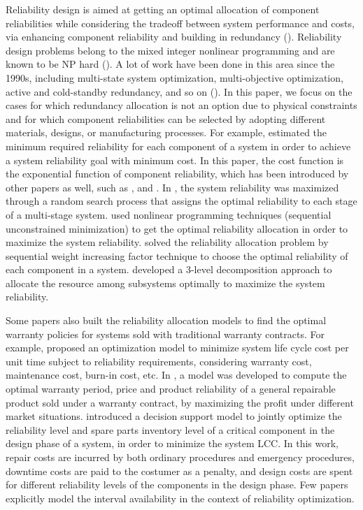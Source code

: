 \documentclass[preprint,12pt]{elsarticle}
\begin{document}
 Reliability design is aimed at getting an optimal allocation of component reliabilities while considering the tradeoff between system performance and costs, via enhancing component reliability and building in redundancy (\citet{Kuo}). Reliability design problems belong to the mixed integer nonlinear programming and are known to be NP hard (\citet{Chern}). A lot of work have been done in this area since the 1990s, including multi-state system optimization, multi-objective optimization, active and cold-standby redundancy, and so on (\citet{Kuo}). In this paper, we focus on the cases for which redundancy allocation is not an option due to physical constraints and for which component reliabilities can be selected by adopting different materials, designs, or manufacturing processes. For example, \citet{Mettas} estimated the minimum required reliability for each component of a system in order to achieve a system reliability goal with minimum cost. In this paper, the cost function is the exponential function of component reliability, which has been introduced by other papers as well, such as \citet{Huang}, \citet{Oner2010} and \citet{Jin}. In \citet{Beraha}, the system reliability was maximized through a random search process that assigns the optimal reliability to each stage of a multi-stage system. \citet{Hwang} used nonlinear programming techniques (sequential unconstrained minimization) to get the optimal reliability allocation in order to maximize the system reliability. \citet{Sheela} solved the reliability allocation problem by sequential weight increasing factor technique to choose the optimal reliability of each component in a system. \citet{Li} developed a 3-level decomposition approach to allocate the resource among subsystems optimally to maximize the system reliability.

Some papers also built the reliability allocation models to find the optimal warranty policies for systems sold with traditional warranty contracts. For example, \citet{Zuo1998} proposed an optimization model to minimize system life cycle cost per unit time subject to reliability requirements, considering warranty cost, maintenance cost, burn-in cost, etc. In \citet{Huang}, a model was developed to compute the optimal warranty period, price and product reliability of a general repairable product sold under a warranty contract, by maximizing the profit under different market situations. \citet{Oner2010} introduced a decision support model to jointly optimize the reliability level and spare parts inventory level of a critical component in the design phase of a system, in order to minimize the system LCC. In this work, repair costs are incurred by both ordinary procedures and emergency procedures, downtime costs are paid to the costumer as a penalty, and design costs are spent for different reliability levels of the components in the design phase. Few papers explicitly model the interval availability in the context of reliability optimization.
\end{document}
